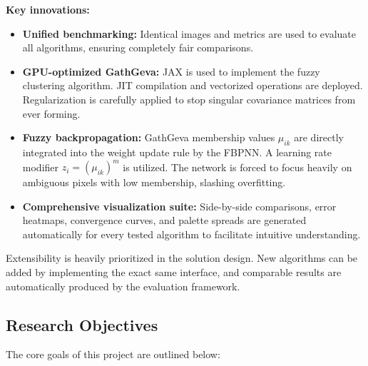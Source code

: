 \textbf{Key innovations:}
\begin{itemize}
    \item \textbf{Unified benchmarking:} Identical images and metrics are used to evaluate all algorithms, ensuring completely fair comparisons.
    \item \textbf{GPU-optimized GathGeva:} JAX is used to implement the fuzzy clustering algorithm. JIT compilation and vectorized operations are deployed. Regularization is carefully applied to stop singular covariance matrices from ever forming.
    \item \textbf{Fuzzy backpropagation:} GathGeva membership values $\mu_{ik}$ are directly integrated into the weight update rule by the FBPNN. A learning rate modifier $z_i = (\mu_{ik})^m$ is utilized. The network is forced to focus heavily on ambiguous pixels with low membership, slashing overfitting.
    \item \textbf{Comprehensive visualization suite:} Side-by-side comparisons, error heatmaps, convergence curves, and palette spreads are generated automatically for every tested algorithm to facilitate intuitive understanding.
\end{itemize}

Extensibility is heavily prioritized in the solution design. New algorithms can be added by implementing the exact same interface, and comparable results are automatically produced by the evaluation framework.

\subsection{Research Objectives}

The core goals of this project are outlined below:

